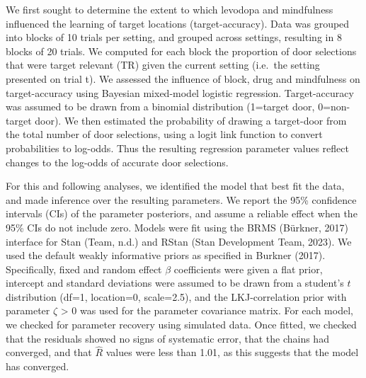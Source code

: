 \documentclass[
  man]{apa6}
\begin{document}
\label{sec:Target-Accuracy}

We first sought to determine the extent to which levodopa and mindfulness influenced the learning of target locations (target-accuracy). Data was grouped into blocks of 10 trials per setting, and grouped across settings, resulting in 8 blocks of 20 trials. We computed for each block the proportion of door selections that were target relevant (TR) given the current setting (i.e.~the setting presented on trial t). We assessed the influence of block, drug and mindfulness on target-accuracy using Bayesian mixed-model logistic regression. Target-accuracy was assumed to be drawn from a binomial distribution (1=target door, 0=non-target door). We then estimated the probability of drawing a target-door from the total number of door selections, using a logit link function to convert probabilities to log-odds. Thus the resulting regression parameter values reflect changes to the log-odds of accurate door selections.

For this and following analyses, we identified the model that best fit the data, and made inference over the resulting parameters. We report the 95\% confidence intervals (CIs) of the parameter posteriors, and assume a reliable effect when the 95\% CIs do not include zero. Models were fit using the BRMS (Bürkner, 2017) interface for Stan (Team, n.d.) and RStan (Stan Development Team, 2023). We used the default weakly informative priors as specified in Burkner (2017). Specifically, fixed and random effect \(\beta\) coefficients were given a flat prior, intercept and standard deviations were assumed to be drawn from a student's \(t\) distribution (df=1, location=0, scale=2.5), and the LKJ-correlation prior with parameter \(\zeta\) \textgreater{} 0 was used for the parameter covariance matrix. For each model, we checked for parameter recovery using simulated data. Once fitted, we checked that the residuals showed no signs of systematic error, that the chains had converged, and that \(\hat{R}\) values were less than 1.01, as this suggests that the model has converged.
\end{document}

